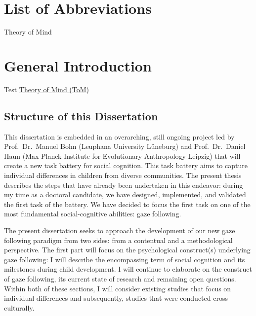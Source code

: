 \documentclass[
]{scrbook}
\providecommand{\tightlist}{%
  \setlength{\itemsep}{0pt}\setlength{\parskip}{0pt}}
\begin{document}
\chapter{List of Abbreviations}\label{acronyms_HEADER_LOA}

\begin{description}
\tightlist
\item[\phantomsection\label{acronyms_ToM}{ToM}]
Theory of Mind
\end{description}

\mainmatter

\chapter{General Introduction}\label{introduction}

Test \hyperref[acronyms_ToM]{Theory of Mind (ToM)}

\section{Structure of this Dissertation}\label{structure-of-this-dissertation}

This dissertation is embedded in an overarching, still ongoing project led by Prof.~Dr.~Manuel Bohn (Leuphana University Lüneburg) and Prof.~Dr.~Daniel Haun (Max Planck Institute for Evolutionary Anthropology Leipzig) that will create a new task battery for social cognition. This task battery aims to capture individual differences in children from diverse communities. The present thesis describes the steps that have already been undertaken in this endeavor: during my time as a doctoral candidate, we have designed, implemented, and validated the first task of the battery. We have decided to focus the first task on one of the most fundamental social-cognitive abilities: gaze following.

The present dissertation seeks to approach the development of our new gaze following paradigm from two sides: from a contentual and a methodological perspective. The first part will focus on the psychological construct(s) underlying gaze following: I will describe the encompassing term of social cognition and its milestones during child development. I will continue to elaborate on the construct of gaze following, its current state of research and remaining open questions. Within both of these sections, I will consider existing studies that focus on individual differences and subsequently, studies that were conducted cross-culturally.
\end{document}
